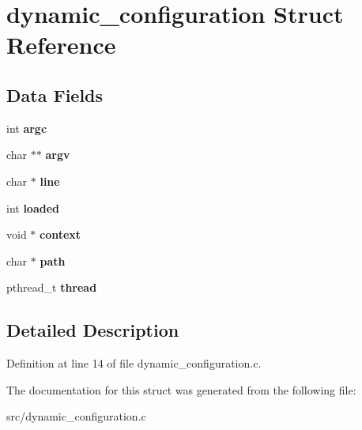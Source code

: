 \hypertarget{structdynamic__configuration}{\section{dynamic\-\_\-configuration \-Struct \-Reference}
\label{structdynamic__configuration}
}
\subsection*{\-Data \-Fields}
\begin{DoxyCompactItemize}
\item 
\hypertarget{structdynamic__configuration_a4d999edecd1e446cecd6db369993f49a}{int {\bfseries argc}}\label{structdynamic__configuration_a4d999edecd1e446cecd6db369993f49a}

\item 
\hypertarget{structdynamic__configuration_afe6cc85aa1fabdda46c99efdb0a6aac0}{char $\ast$$\ast$ {\bfseries argv}}\label{structdynamic__configuration_afe6cc85aa1fabdda46c99efdb0a6aac0}

\item 
\hypertarget{structdynamic__configuration_a1aec948eff5b6534d2ccfff29fc01033}{char $\ast$ {\bfseries line}}\label{structdynamic__configuration_a1aec948eff5b6534d2ccfff29fc01033}

\item 
\hypertarget{structdynamic__configuration_ae4a21fb1648a91a0ff4f5ba03e30671f}{int {\bfseries loaded}}\label{structdynamic__configuration_ae4a21fb1648a91a0ff4f5ba03e30671f}

\item 
\hypertarget{structdynamic__configuration_a4bf0a144822b118e8f6dbea4a9da726f}{void $\ast$ {\bfseries context}}\label{structdynamic__configuration_a4bf0a144822b118e8f6dbea4a9da726f}

\item 
\hypertarget{structdynamic__configuration_a1b9ad32a84e1c94fe9d4f7cdf0dfc54f}{char $\ast$ {\bfseries path}}\label{structdynamic__configuration_a1b9ad32a84e1c94fe9d4f7cdf0dfc54f}

\item 
\hypertarget{structdynamic__configuration_a64662df029b916eed0b0450f0cb2683c}{pthread\-\_\-t {\bfseries thread}}\label{structdynamic__configuration_a64662df029b916eed0b0450f0cb2683c}

\end{DoxyCompactItemize}


\subsection{\-Detailed \-Description}


\-Definition at line 14 of file dynamic\-\_\-configuration.\-c.



\-The documentation for this struct was generated from the following file\-:\begin{DoxyCompactItemize}
\item 
src/dynamic\-\_\-configuration.\-c\end{DoxyCompactItemize}
